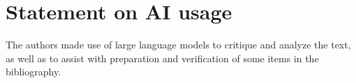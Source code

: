 %
%
%
%
%
%
%
%
%
%
%
%
%
%

\section{Statement on AI usage}
The authors made use of large language models  to critique and analyze the text, as well as to assist with preparation and verification of   some items in the bibliography.
 

